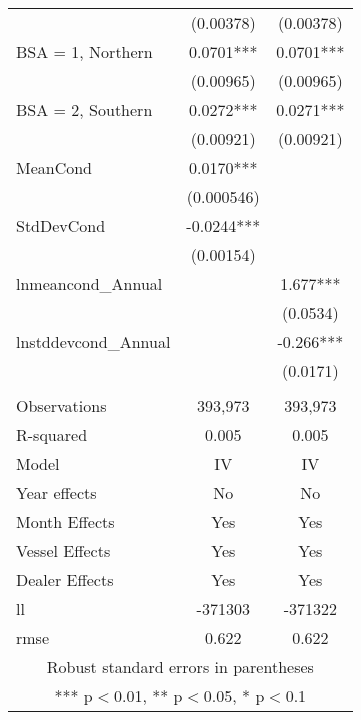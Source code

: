 \begin{tabular}{lcc}
 & (0.00378) & (0.00378) \\
BSA = 1, Northern & 0.0701*** & 0.0701*** \\
 & (0.00965) & (0.00965) \\
BSA = 2, Southern & 0.0272*** & 0.0271*** \\
 & (0.00921) & (0.00921) \\
MeanCond & 0.0170*** &  \\
 & (0.000546) &  \\
StdDevCond & -0.0244*** &  \\
 & (0.00154) &  \\
lnmeancond\_Annual &  & 1.677*** \\
 &  & (0.0534) \\
lnstddevcond\_Annual &  & -0.266*** \\
 &  & (0.0171) \\
 &  &  \\
Observations & 393,973 & 393,973 \\
R-squared & 0.005 & 0.005 \\
Model & IV & IV \\
Year effects & No & No \\
Month Effects & Yes & Yes \\
Vessel Effects & Yes & Yes \\
Dealer Effects & Yes & Yes \\
ll & -371303 & -371322 \\
 rmse & 0.622 & 0.622 \\ \hline
\multicolumn{3}{c}{ Robust standard errors in parentheses} \\
\multicolumn{3}{c}{ *** p$<$0.01, ** p$<$0.05, * p$<$0.1} \\
\end{tabular}
